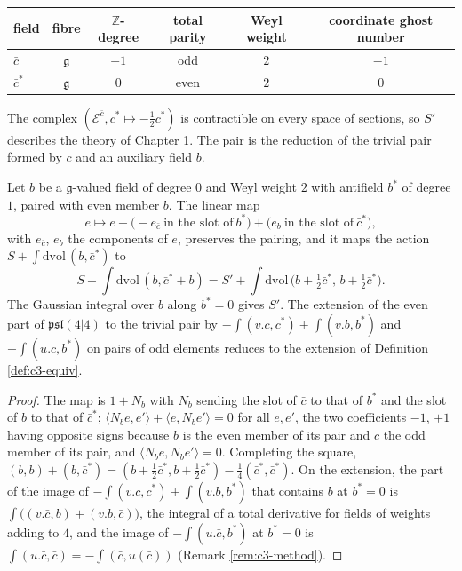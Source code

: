 \begin{tabular}{l|c|c|c|c|c}
field & fibre & $\mathbb Z$-degree & total parity & Weyl weight & coordinate ghost number \\
\hline
$\bar c$ & $\mathfrak g$ & $+1$ & odd & $2$ & $-1$ \\
$\bar c^*$ & $\mathfrak g$ & $0$ & even & $2$ & $0$ \\
\end{tabular}

The complex $(\mathscr E^{\bar c},\bar c^*\mapsto-\tfrac12\bar c^*)$ is contractible on every space of sections, so $S'$ describes the theory of Chapter 1. The pair is the reduction of the trivial pair formed by $\bar c$ and an auxiliary field $b$.

\begin{proposition}
\label{prop:c3-trivial}
Let $b$ be a $\mathfrak g$-valued field of degree $0$ and Weyl weight $2$ with antifield $b^*$ of degree $1$, paired with even member $b$. The linear map
\[
e\mapsto e+\big(-e_{\bar c}\ \text{in the slot of}\ b^*\big)+\big(e_b\ \text{in the slot of}\ \bar c^*\big),
\]
with $e_{\bar c}$, $e_b$ the components of $e$, preserves the pairing, and it maps the action $S+\int\mathrm{dvol}\,(b,\bar c^*)$ to
\[
S+\int\mathrm{dvol}\,(b,\bar c^*+b)=S'+\int\mathrm{dvol}\,\big(b+\tfrac12\bar c^*,\,b+\tfrac12\bar c^*\big).
\]
The Gaussian integral over $b$ along $b^*=0$ gives $S'$. The extension of the even part of $\mathfrak{psl}(4|4)$ to the trivial pair by $-\int(v.\bar c,\bar c^*)+\int(v.b,b^*)$ and $-\int(u.\bar c,b^*)$ on pairs of odd elements reduces to the extension of Definition \ref{def:c3-equiv}.
\end{proposition}

\begin{proof}
The map is $1+N_b$ with $N_b$ sending the slot of $\bar c$ to that of $b^*$ and the slot of $b$ to that of $\bar c^*$; $\langle N_be,e'\rangle+\langle e,N_be'\rangle=0$ for all $e,e'$, the two coefficients $-1$, $+1$ having opposite signs because $b$ is the even member of its pair and $\bar c$ the odd member of its pair, and $\langle N_be,N_be'\rangle=0$. Completing the square, $(b,b)+(b,\bar c^*)=(b+\tfrac12\bar c^*,b+\tfrac12\bar c^*)-\tfrac14(\bar c^*,\bar c^*)$. On the extension, the part of the image of $-\int(v.\bar c,\bar c^*)+\int(v.b,b^*)$ that contains $b$ at $b^*=0$ is $\int\big((v.\bar c,b)+(v.b,\bar c)\big)$, the integral of a total derivative for fields of weights adding to $4$, and the image of $-\int(u.\bar c,b^*)$ at $b^*=0$ is $\int(u.\bar c,\bar c)=-\int(\bar c,u(\bar c))$ (Remark \ref{rem:c3-method}).
\end{proof}

